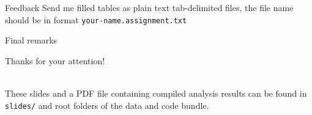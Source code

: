 \documentclass[12pt]{beamer}
\begin{document}
\begin{frame}{Feedback}
Send me filled tables as plain text tab-delimited files, the file name should be in format \texttt{your-name.assignment.txt}
\end{frame}

\begin{frame}{Final remarks}
\begin{LARGE}
\begin{center}
Thanks for your attention!\\~\
\end{center}
\end{LARGE}


These slides and a PDF file containing compiled analysis results can be found in \texttt{slides/} and root folders of the data and code bundle.
\end{frame}
\end{document}
